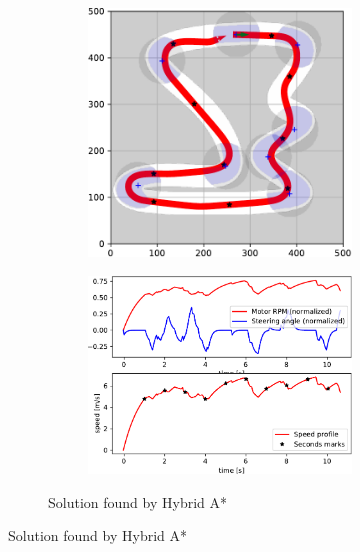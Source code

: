\begin{figure}[!tbp]%
	\centering
	
	\begin{subfigure}[t]{\textwidth}
		\begin{subfigure}[t]{0.45\textwidth}
			\includegraphics[width=\textwidth]{../img/experiments/tornado-hybrid_astar-trajectory}
		\end{subfigure}
		\hfill
		\begin{subfigure}[t]{0.45\textwidth}
			\includegraphics[width=\textwidth]{../img/experiments/tornado-hybrid_astar-actuators}
		\end{subfigure}
		\caption{Solution found by Hybrid A*}
		\label{fig:solution_tornado-hybrid_astar}	
	\end{subfigure}
	

\end{figure}
